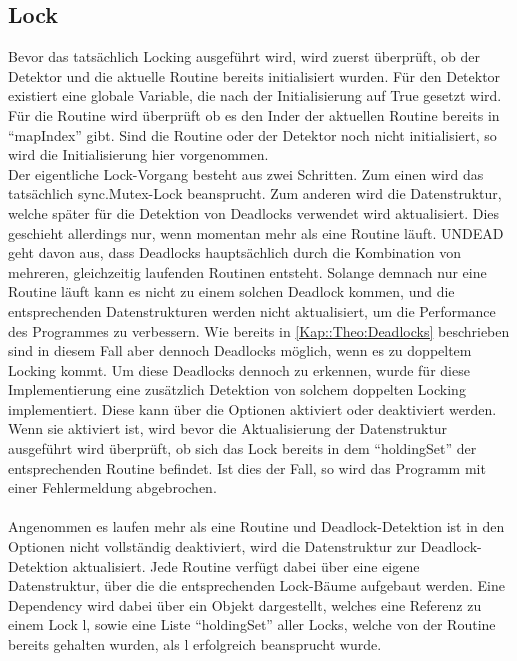 \subsection{Lock}\label{Chap::Implementation:Logging.Lock}
Bevor das tatsächlich Locking ausgeführt wird, wird zuerst überprüft, ob der 
Detektor
und die aktuelle Routine bereits initialisiert wurden. Für den Detektor existiert
eine globale Variable, die nach der Initialisierung auf True gesetzt wird. Für
die Routine wird überprüft ob es den Inder der aktuellen Routine bereits in 
``mapIndex'' gibt. Sind die Routine oder der Detektor noch nicht initialisiert,
so wird die Initialisierung hier vorgenommen.\\
Der eigentliche Lock-Vorgang besteht aus zwei Schritten. Zum einen wird das tatsächlich
sync.Mutex-Lock beansprucht. Zum anderen wird die Datenstruktur, welche später 
für die Detektion von Deadlocks verwendet wird aktualisiert. Dies geschieht 
allerdings nur, wenn momentan mehr als eine Routine läuft. UNDEAD geht davon
aus, dass Deadlocks hauptsächlich durch die Kombination von mehreren, gleichzeitig
laufenden Routinen entsteht. Solange demnach nur eine Routine läuft kann es 
nicht zu einem solchen Deadlock kommen, und die entsprechenden Datenstrukturen 
werden nicht aktualisiert, um die Performance des Programmes zu verbessern. 
Wie bereits in \ref{Kap::Theo:Deadlocks} beschrieben sind in diesem Fall 
aber dennoch Deadlocks möglich, wenn es zu doppeltem Locking kommt. Um diese 
Deadlocks dennoch zu erkennen, wurde für diese Implementierung eine zusätzlich
Detektion von solchem doppelten Locking implementiert. Diese kann über die 
Optionen aktiviert oder deaktiviert werden. Wenn sie aktiviert ist, wird bevor 
die Aktualisierung der 
Datenstruktur ausgeführt wird überprüft, ob sich das Lock bereits in dem
``holdingSet'' der entsprechenden Routine befindet. Ist dies der Fall, so wird 
das Programm mit einer Fehlermeldung abgebrochen. \\
\\
Angenommen es laufen mehr als eine Routine und Deadlock-Detektion ist in den 
Optionen nicht vollständig deaktiviert, wird die Datenstruktur zur 
Deadlock-Detektion aktualisiert. Jede Routine verfügt dabei 
über eine eigene 
Datenstruktur, über die die entsprechenden Lock-Bäume aufgebaut werden. 
Eine Dependency wird dabei über ein Objekt dargestellt, welches eine Referenz 
zu einem Lock l, sowie eine Liste  ``holdingSet'' aller Locks, welche von der 
Routine bereits 
gehalten wurden, als l erfolgreich beansprucht wurde.\\
